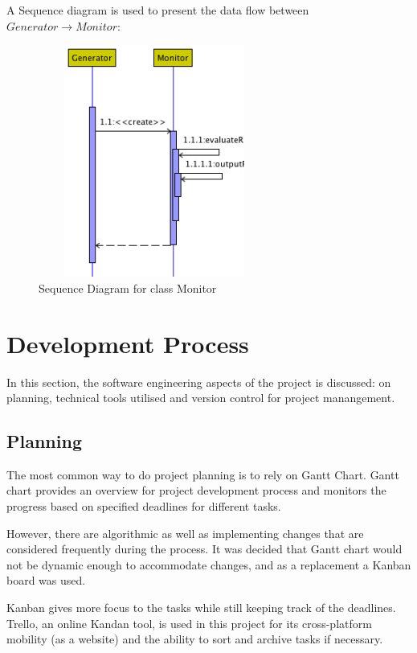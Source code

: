\begin{description}
A Sequence diagram is used to present the data flow between $Generator \rightarrow Monitor$:
\begin{figure}[h]
    \centering
    \includegraphics[width=3in, height=3in]{figures/sequence_monitor}
    \caption[Sequence Diagram for class Monitor]{Sequence Diagram for class Monitor}
    \label{fig:figure4_62}
\end{figure}

\end{description}

\section{Development Process}

In this section, the software engineering aspects of the project is discussed: on planning, technical tools utilised and version control for project manangement.

\subsection{Planning}

The most common way to do project planning is to rely on Gantt Chart. Gantt chart provides an overview for project development process and monitors the progress based on specified deadlines for different tasks.

However, there are algorithmic as well as implementing changes that are considered frequently during the process. It was decided that Gantt chart would not be dynamic enough to accommodate changes, and as a replacement a Kanban board was used.

Kanban gives more focus to the tasks while still keeping track of the deadlines. Trello, an online Kandan tool, is used in this project for its cross-platform mobility (as a website) and the ability to sort and archive tasks if necessary.

